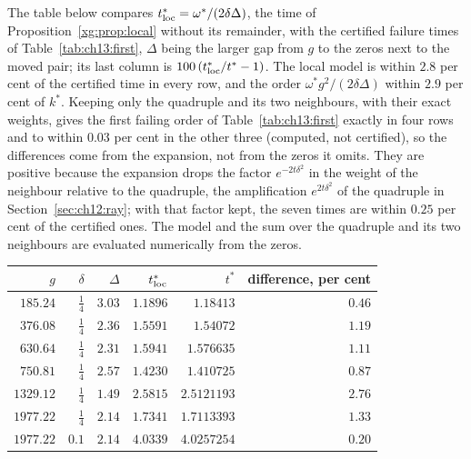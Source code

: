 The table below compares $t^*_{\rm loc}=\omega^*/(2\delta\Delta)$, the time of Proposition~\ref{xg:prop:local} without its remainder, with the certified failure times of Table~\ref{tab:ch13:first}, $\Delta$ being the larger gap from $g$ to the zeros next to the moved pair; its last column is $100\,(t^*_{\rm loc}/t^*-1)$. The local model is within $2.8$ per cent of the certified time in every row, and the order $\omega^*g^2/(2\delta\Delta)$ within $2.9$ per cent of $k^*$. Keeping only the quadruple and its two neighbours, with their exact weights, gives the first failing order of Table~\ref{tab:ch13:first} exactly in four rows and to within $0.03$ per cent in the other three (computed, not certified), so the differences come from the expansion, not from the zeros it omits. They are positive because the expansion drops the factor $e^{-2t\delta^2}$ in the weight of the neighbour relative to the quadruple, the amplification $e^{2t\delta^2}$ of the quadruple in Section~\ref{sec:ch12:ray}; with that factor kept, the seven times are within $0.25$ per cent of the certified ones. The model and the sum over the quadruple and its two neighbours are evaluated numerically from the zeros.

\begin{center}
\small\setlength{\tabcolsep}{4pt}
\begin{tabular}{rrrrrr}
\toprule
$g$ & $\delta$ & $\Delta$ & $t^*_{\rm loc}$ & $t^*$ & difference, per cent\\
\midrule
$185.24$ & $\frac14$ & $3.03$ & $1.1896$ & $1.18413$ & $0.46$\\
$376.08$ & $\frac14$ & $2.36$ & $1.5591$ & $1.54072$ & $1.19$\\
$630.64$ & $\frac14$ & $2.31$ & $1.5941$ & $1.576635$ & $1.11$\\
$750.81$ & $\frac14$ & $2.57$ & $1.4230$ & $1.410725$ & $0.87$\\
$1329.12$ & $\frac14$ & $1.49$ & $2.5815$ & $2.5121193$ & $2.76$\\
$1977.22$ & $\frac14$ & $2.14$ & $1.7341$ & $1.7113393$ & $1.33$\\
$1977.22$ & $0.1$ & $2.14$ & $4.0339$ & $4.0257254$ & $0.20$\\
\bottomrule
\end{tabular}
\end{center}
